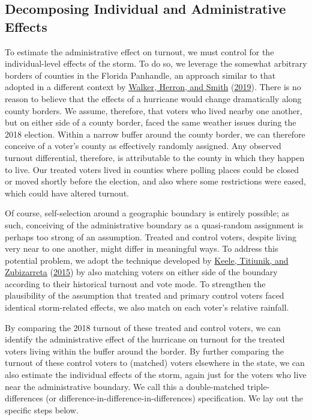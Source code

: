 \documentclass[
  12pt,
]{article}
\begin{document}
\hypertarget{decomposing-individual-and-administrative-effects}{%
\subsection*{Decomposing Individual and Administrative Effects}\label{decomposing-individual-and-administrative-effects}}

To estimate the administrative effect on turnout, we must control for the individual-level effects of the storm. To do so, we leverage the somewhat arbitrary borders of counties in the Florida Panhandle, an approach similar to that adopted in a different context by \protect\hyperlink{ref-Walker2019}{Walker, Herron, and Smith} (\protect\hyperlink{ref-Walker2019}{2019}). There is no reason to believe that the effects of a hurricane would change dramatically along county borders. We assume, therefore, that voters who lived nearby one another, but on either side of a county border, faced the same weather issues during the 2018 election. Within a narrow buffer around the county border, we can therefore conceive of a voter's county as effectively randomly assigned. Any observed turnout differential, therefore, is attributable to the county in which they happen to live. Our treated voters lived in counties where polling places could be closed or moved shortly before the election, and also where some restrictions were eased, which could have altered turnout.

Of course, self-selection around a geographic boundary is entirely possible; as such, conceiving of the administrative boundary as a quasi-random assignment is perhaps too strong of an assumption. Treated and control voters, despite living very near to one another, might differ in meaningful ways. To address this potential problem, we adopt the technique developed by \protect\hyperlink{ref-Keele2015a}{Keele, Titiunik, and Zubizarreta} (\protect\hyperlink{ref-Keele2015a}{2015}) by also matching voters on either side of the boundary according to their historical turnout and vote mode. To strengthen the plausibility of the assumption that treated and primary control voters faced identical storm-related effects, we also match on each voter's relative rainfall.

By comparing the 2018 turnout of these treated and control voters, we can identify the administrative effect of the hurricane on turnout for the treated voters living within the buffer around the border. By further comparing the turnout of these control voters to (matched) voters elsewhere in the state, we can also estimate the individual effects of the storm, again just for the voters who live near the administrative boundary. We call this a double-matched triple-differences (or difference-in-difference-in-differences) specification. We lay out the specific steps below.
\end{document}
